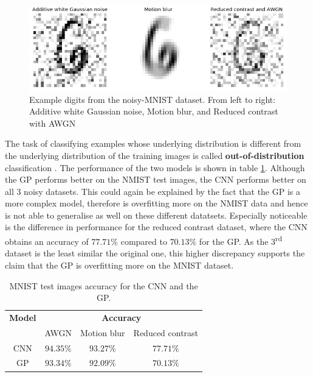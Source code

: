 \documentclass{article}
\begin{document}
\begin{figure}
	\centering
	\includegraphics[scale=0.2]{noisy_mnist_example}
	\caption{Example digits from the noisy-MNIST dataset. From left to right: Additive white Gaussian noise, Motion blur, and Reduced contrast with AWGN}
	\label{fig/noisy_mnist_example}
\end{figure}

The task of classifying examples whose underlying distribution is different from the underlying distribution of the training images is called \textbf{out-of-distribution} classification \cite{Gal2016Uncertainty}. The performance of the two models is shown in table \ref{table/noisy_mnist_acc}. Although the GP performs better on the NMIST test images, the CNN performs better on all 3 noisy datasets. This could again be explained by the fact that the GP is a more complex model, therefore is overfitting more on the NMIST data and hence is not able to generalise as well on these different datatsets. Especially noticeable is the difference in performance for the reduced contrast dataset, where the CNN obtains an accuracy of $77.71\%$ compared to $70.13\%$ for the GP. As the 3\textsuperscript{rd} dataset is the least similar the original one, this higher discrepancy supports the claim that the GP is overfitting more on the MNIST dataset.

\begin{table}[h]
\centering	
{\renewcommand{\arraystretch}{1.2} %
\begin{tabular}{ c | c c c}
\textbf{Model} & \multicolumn{3}{c}{\textbf{Accuracy}}\\
& AWGN & Motion blur & Reduced contrast\\
\hline
CNN & $94.35\%$ & $93.27\%$ & $77.71\%$ \\
GP & $93.34\%$  & $92.09\%$ & $70.13\%$ \\
\end{tabular}
}
\caption{MNIST test images accuracy for the CNN and the GP.}
\label{table/noisy_mnist_acc}
\end{table}
\end{document}
